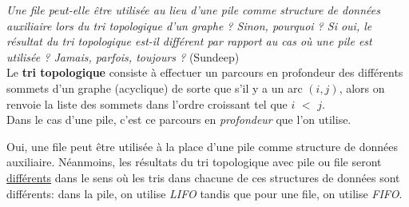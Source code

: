 \textit{Une file peut-elle être utilisée au lieu d’une pile comme structure de données auxiliaire lors du tri topologique d’un graphe ? Sinon, pourquoi ? Si oui, le résultat du tri topologique est-il différent par rapport au cas où une pile est utilisée ? Jamais, parfois, toujours ?} (Sundeep)\\

Le \textbf{tri topologique} consiste à effectuer un parcours en profondeur des différents sommets d'un graphe (acyclique) de sorte que s'il y a un arc $(i, j)$, alors on renvoie la liste des sommets dans l'ordre croissant tel que $i$ $<$ $j$. \\
Dans le cas d'une pile, c'est ce parcours en \textit{profondeur} que l'on utilise. 

Oui, une file peut être utilisée à la place d'une pile comme structure de données auxiliaire. Néanmoins, les résultats du tri topologique avec pile ou file seront \underline{différents} dans le sens où les tris dans chacune de ces structures de données sont différents: dans la pile, on utilise \textit{LIFO} tandis que pour une file, on utilise \textit{FIFO}. \\